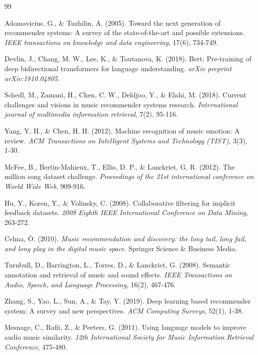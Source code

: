\documentclass[12pt,a4paper]{article}
\begin{document}
\begin{thebibliography}{99}

Adomavicius, G., \& Tuzhilin, A. (2005). Toward the next generation of recommender systems: A survey of the state-of-the-art and possible extensions. \textit{IEEE transactions on knowledge and data engineering}, 17(6), 734-749.

Devlin, J., Chang, M. W., Lee, K., \& Toutanova, K. (2018). Bert: Pre-training of deep bidirectional transformers for language understanding. \textit{arXiv preprint arXiv:1810.04805}.

Schedl, M., Zamani, H., Chen, C. W., Deldjoo, Y., \& Elahi, M. (2018). Current challenges and visions in music recommender systems research. \textit{International journal of multimedia information retrieval}, 7(2), 95-116.

Yang, Y. H., \& Chen, H. H. (2012). Machine recognition of music emotion: A review. \textit{ACM Transactions on Intelligent Systems and Technology (TIST)}, 3(3), 1-30.

McFee, B., Bertin-Mahieux, T., Ellis, D. P., \& Lanckriet, G. R. (2012). The million song dataset challenge. \textit{Proceedings of the 21st international conference on World Wide Web}, 909-916.

Hu, Y., Koren, Y., \& Volinsky, C. (2008). Collaborative filtering for implicit feedback datasets. \textit{2008 Eighth IEEE International Conference on Data Mining}, 263-272.

Celma, Ò. (2010). \textit{Music recommendation and discovery: the long tail, long fail, and long play in the digital music space}. Springer Science \& Business Media.

Turnbull, D., Barrington, L., Torres, D., \& Lanckriet, G. (2008). Semantic annotation and retrieval of music and sound effects. \textit{IEEE Transactions on Audio, Speech, and Language Processing}, 16(2), 467-476.

Zhang, S., Yao, L., Sun, A., \& Tay, Y. (2019). Deep learning based recommender system: A survey and new perspectives. \textit{ACM Computing Surveys}, 52(1), 1-38.

Mesnage, C., Rafii, Z., \& Peeters, G. (2011). Using language models to improve audio music similarity. \textit{12th International Society for Music Information Retrieval Conference}, 475-480.

\end{thebibliography}
\end{document}
